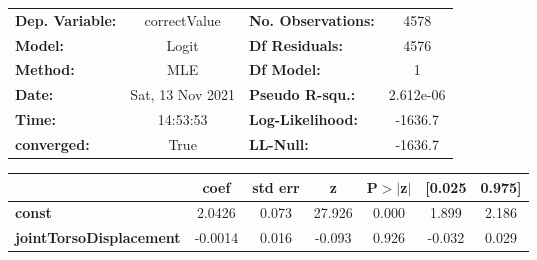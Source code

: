 \begin{center}
\begin{tabular}{lclc}
\toprule
\textbf{Dep. Variable:}         &   correctValue   & \textbf{  No. Observations:  } &     4578    \\
\textbf{Model:}                 &      Logit       & \textbf{  Df Residuals:      } &     4576    \\
\textbf{Method:}                &       MLE        & \textbf{  Df Model:          } &        1    \\
\textbf{Date:}                  & Sat, 13 Nov 2021 & \textbf{  Pseudo R-squ.:     } & 2.612e-06   \\
\textbf{Time:}                  &     14:53:53     & \textbf{  Log-Likelihood:    } &   -1636.7   \\
\textbf{converged:}             &       True       & \textbf{  LL-Null:           } &   -1636.7   \\
\bottomrule
\end{tabular}
\begin{tabular}{lcccccc}
                                & \textbf{coef} & \textbf{std err} & \textbf{z} & \textbf{P$> |$z$|$} & \textbf{[0.025} & \textbf{0.975]}  \\
\midrule
\textbf{const}                  &       2.0426  &        0.073     &    27.926  &         0.000        &        1.899    &        2.186     \\
\textbf{jointTorsoDisplacement} &      -0.0014  &        0.016     &    -0.093  &         0.926        &       -0.032    &        0.029     \\
\bottomrule
\end{tabular}
\end{center}